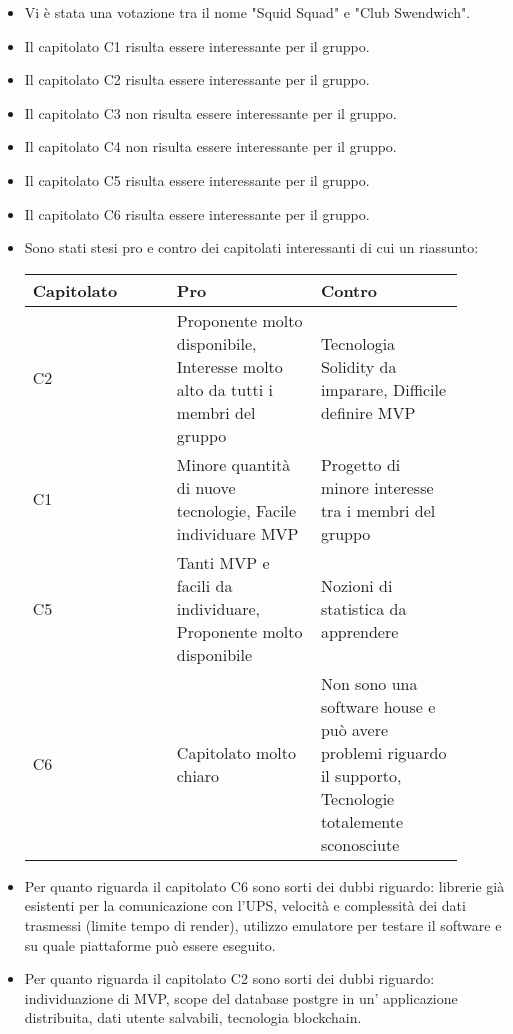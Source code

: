 \begin{itemize}
    \item Vi è stata una votazione tra il nome "Squid Squad" e "Club Swendwich".
    \item Il capitolato C1 risulta essere interessante per il gruppo.
    \item Il capitolato C2 risulta essere interessante per il gruppo.
    \item Il capitolato C3 non risulta essere interessante per il gruppo.
    \item Il capitolato C4 non risulta essere interessante per il gruppo.
    \item Il capitolato C5 risulta essere interessante per il gruppo.
    \item Il capitolato C6 risulta essere interessante per il gruppo.
    \item Sono stati stesi pro e contro dei capitolati interessanti di cui un riassunto: \\
        \begin{tabular}{|p{0.30\linewidth} |p{0.30\linewidth} p{0.30 \linewidth}|}
        \hline
        Capitolato & Pro & Contro                                                                                                                                             \\
        \hline
        C2         & Proponente molto disponibile, Interesse molto alto da tutti i membri del gruppo & Tecnologia Solidity da imparare, Difficile definire MVP \\
        \hline
        C1         & Minore quantità di nuove tecnologie, Facile individuare MVP & Progetto di minore interesse tra i membri del gruppo \\
        \hline
        C5         & Tanti MVP e facili da individuare, Proponente molto disponibile & Nozioni di statistica da apprendere \\
        \hline
        C6         & Capitolato molto chiaro & Non sono una software house e può avere problemi riguardo il supporto, Tecnologie totalemente sconosciute \\
        \hline
        \end{tabular}
    \item Per quanto riguarda il capitolato C6 sono sorti dei dubbi riguardo: librerie già esistenti per la comunicazione con l'UPS, velocità e complessità dei dati trasmessi (limite tempo di render), utilizzo emulatore per testare il software e su quale piattaforme può essere eseguito.
    \item Per quanto riguarda il capitolato C2 sono sorti dei dubbi riguardo: individuazione di MVP, scope del database postgre in un' applicazione distribuita, dati utente salvabili, tecnologia blockchain.

\end{itemize}

